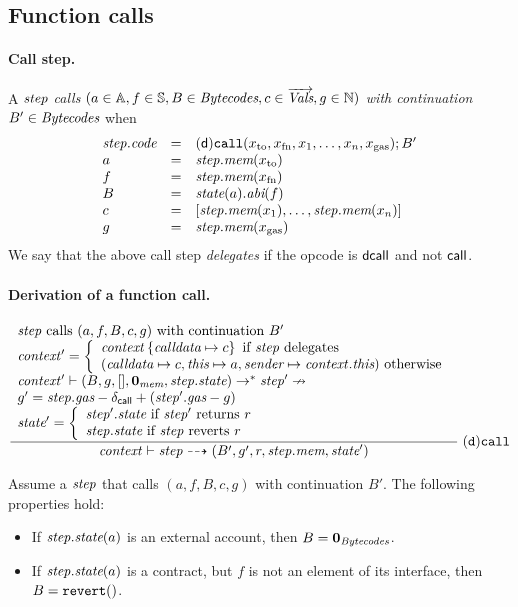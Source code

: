 \subsection{Function calls}

\paragraph{Call step.}
A $\mathit{step}$ \emph{calls $(a\in\mathbb{A},f\in\mathbb{S},B\in\textit{Bytecodes},c\in\overrightarrow{\textit{Vals}},g\in\mathbb{N})$ with continuation} $B'\in\textit{Bytecodes}$ when
$$
\begin{array}{lll}
    \mathit{step}.\textit{code} &=&  \mathsf{(d)}\mathtt{call}(x_{\rm to},x_{\rm fn},x_1,\dots,x_n, x_{\rm gas});B' \\
    a & =& \mathit{step}.\textit{mem}(x_{\rm to}) \\
    f & =& \mathit{step}.\textit{mem}(x_{\rm fn}) \\
    B &=& \textit{state}(a).\textit{abi}(f)\\
    c & =& [\mathit{step}.\textit{mem}(x_1),\dots,\mathit{step}.\textit{mem}(x_n)] \\
    g & =&\mathit{step}.\textit{mem}(x_{\rm gas}) 
\end{array}
$$
We say that the above call step \emph{delegates} if the opcode is ${\sf dcall}$ and not ${\sf call}$.

\paragraph{Derivation of a function call.}

$$
\dfrac{
	\begin{array}{l}
	\textrm{$\mathit{step}$ calls $(a,f,B,c,g)$ with continuation $B'$} \\
	\mathit{context}' = \left\{\begin{array}{l}
	\mathit{context}\left\{\textit{calldata}\mapsto c\right\} \textrm{ if $\mathit{step}$ delegates}\\
	(\textit{calldata}\mapsto c,\textit{this}\mapsto a,\textit{sender}\mapsto\mathit{context}.\textit{this}) \textrm{ otherwise}\\
	\end{array}\right. \\
	\mathit{context}'\vdash (B,g,[],\mathbf{0}_{\textit{mem}},\mathit{step}.\textit{state})\to^* \mathit{step}' \nrightarrow \\
	g' = \mathit{step}.\textit{gas}-\delta_{\mathsf{call}}+(\mathit{step}'.\textit{gas}-g) \\
	\textit{state}' =\left\{
    \begin{array}{l}
        \textrm{$\mathit{step}'.\textit{state}$ if $\mathit{step}'$ returns $r$}\\
        \textrm{$\mathit{step}.\textit{state}$ if $\mathit{step}$ reverts $r$}
    \end{array}\right.
	\end{array}
}
{\mathit{context}\vdash\mathit{step} \dashrightarrow (B',g' ,r,\mathit{step}.\textit{mem},\textit{state}')}\;\mathtt{(d)call}
$$

\begin{property}
Assume a $\mathit{step}$ that calls $(a,f,B,c,g)$ with continuation $B'$. The following properties hold:
\begin{itemize}
\item If $\mathit{step}.\textit{state}(a)$ is an external account, then $B=\mathbf{0}_{\textit{Bytecodes}}$.
\item If $\mathit{step}.\textit{state}(a)$ is a contract, but $f$ is not an element of its interface, then $B=\mathtt{revert}()$. 
\end{itemize}
\end{property}